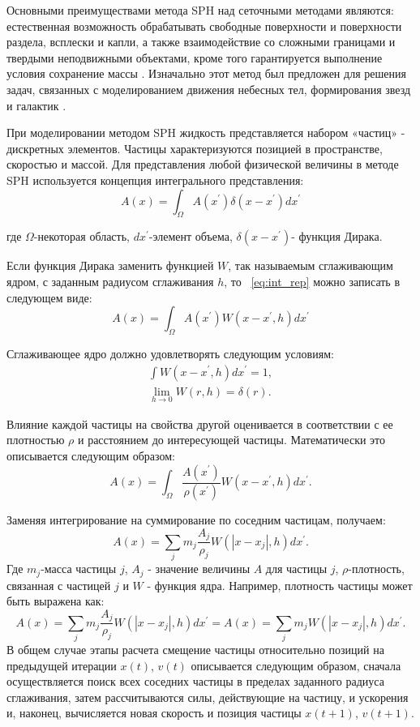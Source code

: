 Основными преимуществами метода SPH над сеточными методами являются: естественная возможность обрабатывать свободные поверхности и поверхности раздела, всплески и капли, а также взаимодействие со сложными границами и твердыми неподвижными объектами, кроме того гарантируется выполнение условия сохранение массы \cite {Müller2003, Müller2005, Keiser2005, Solenthaler2007, Solenthaler2008, Becker2007}. Изначально этот метод был предложен для решения задач, связанных с моделированием движения небесных тел, формирования звезд и галактик \cite{Gingold1977, Lucy1977}.

При моделировании методом SPH жидкость представляется набором «частиц» - дискретных элементов. Частицы характеризуются позицией в пространстве, скоростью и массой. Для представления любой физической величины  в методе SPH используется концепция интегрального представления:
\begin{equation}
    \label{eq:int_rep}
    A(x) = \int_{\Omega}A(x^{'})\delta (x-x^{'})dx^{'}
\end{equation}

где \(\Omega\)-некоторая область, \(dx^{'}\)-элемент объема, \(\delta (x-x^{'})\)- функция Дирака.

Если функция Дирака заменить функцией \(W\), так называемым сглаживающим ядром, с заданным радиусом сглаживания \(h\), то ~\ref{eq:int_rep} можно записать в следующем виде:
\[
    A(x) = \int_{\Omega}A(x^{'})W(x-x^{'}, h)dx^{'}
\]

Сглаживающее ядро должно удовлетворять следующим условиям:
\begin{align}
    \int W(x-x^{'},h)dx^{'}=1, \nonumber \\
    \lim_{h\rightarrow0}W(r, h) = \delta (r). \nonumber
\end{align}

Влияние каждой частицы на свойства другой оценивается в соответствии с ее плотностью \(\rho\) и расстоянием до интересующей частицы. Математически это описывается следующим образом:
\[
    A(x)=\int_{\Omega}\frac{A(x^{'})}{\rho(x^{'})}W(x-x^{'},h)dx^{'}.
\]

Заменяя интегрирование  на суммирование по соседним частицам, получаем:
\[
    A(x)=\sum_{j}m_j\frac{A_j}{\rho_j}W(\left | x-x_{j} \right |,h)dx^{'}.
\]
Где \(m_j\)-масса частицы \(j\), \(A_j\) - значение величины \(A\) для частицы \(j\), \(\rho\)-плотность, связанная с частицей \(j\) и \(W\) - функция ядра. Например, плотность частицы может быть выражена как:
\[
    A(x)=\sum_{j}m_j\frac{A_j}{\rho_j}W(\left | x-x_{j} \right |,h)dx^{'}=A(x)=\sum_{j}m_jW(\left | x-x_{j} \right |,h)dx^{'}.
\]
В общем случае этапы расчета смещение частицы относительно позиций на предыдущей итерации \(x(t)\), \(v(t)\) описывается следующим образом, сначала осуществляется поиск всех соседних частицы в пределах заданного радиуса сглаживания, затем рассчитываются силы, действующие на частицу, и ускорения и, наконец, вычисляется новая скорость и позиция частицы \(x(t+1)\), \(v(t+1)\).

